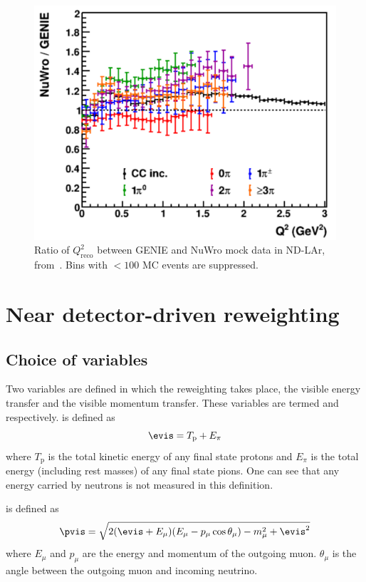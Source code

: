 \begin{figure}[h]
	\centering
	\includegraphics[width=.6\linewidth]{files/figures/dune_ndrwt/larQ2Reco}
	\caption[Ratio of $Q^{2}_{\textrm{reco}}$ between GENIE and NuWro mock data in ND-LAr]{Ratio of $Q^{2}_{\textrm{reco}}$ between GENIE and NuWro mock data in ND-LAr, from~\cite{ndCdr}. Bins with $<100$ MC events are suppressed.}
	\label{fig:q2LarFhc}	
\end{figure}

\section{Near detector-driven reweighting}

\subsection{Choice of variables}

Two variables are defined in which the reweighting takes place, the visible energy transfer and the visible momentum transfer. 
These variables are termed \evis and \pvis respectively.
\evis is defined as 
\begin{equation}
	\evis = T_{\textrm{p}} + E_{\pi}
\end{equation}
where $T_{\textrm{p}}$ is the total kinetic energy of any final state protons and $E_{\pi}$ is the total energy (including rest masses) of any final state pions.
One can see that any energy carried by neutrons is not measured in this definition.

\pvis is defined as
\begin{equation}
	\pvis = \sqrt{ 2(\evis + E_{\mu})(E_{\mu} - p_{\mu}\cos\theta_{\mu}) - m_{\mu}^{2} + \evis^{2} }
\end{equation}
where $E_{\mu}$ and $p_{\mu}$ are the energy and momentum of the outgoing muon.
$\theta_{\mu}$ is the angle between the outgoing muon and incoming neutrino.

